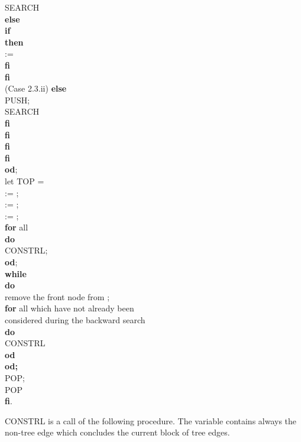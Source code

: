 \documentclass[12pt,twoside,a4paper]{article}
\begin{document}
\begin{tabbing}
\> \> \> \> \> \> \> \> SEARCH \\
\> \> \> \> \> \> \> {\bf else} \\
\> \> \> \> \> \> \> \> {\bf if}  \\
\> \> \> \> \> \> \> \> {\bf then} \\
\> \> \> \> \> \> \> \> \>  :=  \\
\> \> \> \> \> \> \> \> {\bf fi} \\
\> \> \> \> \> \> \> {\bf fi} \\
(Case 2.3.ii) \> \> \> \> \> \> {\bf else} \\
\> \> \> \> \> \> \> PUSH; \\
\> \> \> \> \> \> \> SEARCH \\
\> \> \> \> \> \> {\bf fi} \\
\> \> \> \> \> {\bf fi} \\
\> \> \> \> {\bf fi} \\
\> \> \> {\bf fi} \\
\> \> {\bf od}; \\ 
\> \>  let TOP =  \\
\> \>  := ; \\
\> \>  := ; \\
\> \>  := ; \\
\> \> {\bf for} all  \\
\> \> {\bf do} \\
\> \> \> CONSTRL; \\
\> \> {\bf od}; \\
\> \> {\bf while}  \\
\> \> {\bf do} \\
\> \> \> remove the front node  from ; \\
\> \> \> {\bf for} all  which have not already been \\
\> \> \> \> considered during the backward search \\
\> \> \> {\bf do} \\
\> \> \> \> CONSTRL \\
\> \> \> {\bf od} \\
\> \> {\bf od;} \\
\> POP; \\
\> POP \\
{\bf fi}. \\
\end{tabbing}
\vspace{-.3cm}
\noindent
CONSTRL is a call of the following procedure. The variable  contains 
always the non-tree edge which concludes the current block of tree edges.
\end{document}

